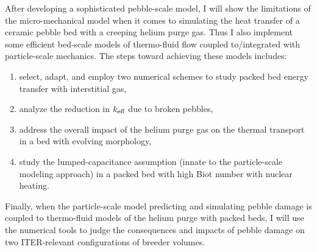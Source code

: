 After developing a sophisticated pebble-scale model, I will show the limitations of the micro-mechanical model when it comes to simulating the heat transfer of a ceramic pebble bed with a creeping helium purge gas. Thus I also implement some efficient bed-scale models of thermo-fluid flow coupled to/integrated with particle-scale mechanics. The steps toward achieving these models includes:
\begin{enumerate}
\item select, adapt, and employ two numerical schemes to study packed bed energy transfer with interstitial gas,
\item analyze the reduction in $k_\text{eff}$ due to broken pebbles,
\item address the overall impact of the helium purge gas on the thermal transport in a bed with evolving morphology,
\item study the lumped-capacitance assumption (innate to the particle-scale modeling approach) in a packed bed with high Biot number with nuclear heating.
\end{enumerate}

Finally, when the particle-scale model predicting and simulating pebble damage is coupled to thermo-fluid models of the helium purge with packed beds, I will use the numerical tools to judge the consequences and impacts of pebble damage on two ITER-relevant configurations of breeder volumes.




